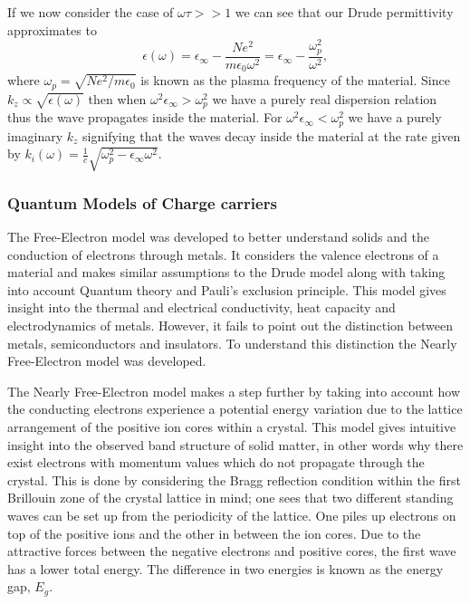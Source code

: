 If we now consider the case of $\omega\tau>>1$ we can see that our Drude permittivity approximates to
\begin{equation}
\epsilon(\omega)=\epsilon_{\infty}-\frac{Ne^2}{m\epsilon_0\omega^2}=\epsilon_{\infty}-\frac{\omega_p^2}{\omega^2},
\label{eq:plasma frequency}
\end{equation}
where $\omega_p=\sqrt{Ne^2/m\epsilon_0}$ is known as the plasma frequency of the material. Since $k_z \propto \sqrt{\epsilon(\omega)}$ then when $\omega^2 \epsilon_\infty>\omega_p^2$ we have a purely real dispersion relation thus the wave propagates inside the material. For $\omega^2 \epsilon_\infty<\omega_p^2$ we have a purely imaginary $k_z$ signifying  that the waves decay inside the material at the rate given by $k_i(\omega)=\frac{1}{c}\sqrt{\omega_p^2-\epsilon_\infty\omega^2}$.


\subsubsection{Quantum Models of Charge carriers}
The Free-Electron model was developed to better understand solids and the conduction of electrons through metals. It considers the valence electrons of a material and makes similar assumptions to the Drude model along with taking into account Quantum theory and Pauli's exclusion principle. This model gives insight into the thermal and electrical conductivity, heat capacity and electrodynamics of metals. However, it fails to point out the distinction between metals, semiconductors and insulators. To understand this distinction the Nearly Free-Electron model was developed.

The Nearly Free-Electron model makes a step further by taking into account how the conducting electrons experience a potential energy variation due to the lattice arrangement of the positive ion cores within a crystal. This model gives intuitive insight into the observed band structure of solid matter, in other words why there exist electrons with momentum values which do not propagate through the crystal. This is done by considering the Bragg reflection condition within the first Brillouin zone of the crystal lattice in mind; one sees that two different standing waves can be set up from the periodicity of the lattice. One piles up electrons on top of the positive ions and the other in between the ion cores. Due to the attractive forces between the negative electrons and positive cores, the first wave has a lower total energy. The difference in two energies is known as the energy gap, $E_g$.


